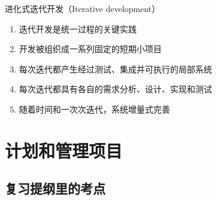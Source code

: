 \documentclass[14pt, letterpaper, UTF8, fontset=windowsnew, heading=true]{article}
\begin{document}
\begin{enumerate}
	进化式迭代开发（Iterative development）
	\begin{enumerate}
		\item 迭代开发是统一过程的关键实践
		\item 开发被组织成一系列固定的短期小项目
		\item 每次迭代都产生经过测试、集成并可执行的局部系统
		\item 每次迭代都具有各自的需求分析、设计、实现和测试
		\item 随着时间和一次次迭代，系统增量式完善
	\end{enumerate}

\end{enumerate}


\section{计划和管理项目}

\subsection{复习提纲里的考点}
\end{document}
